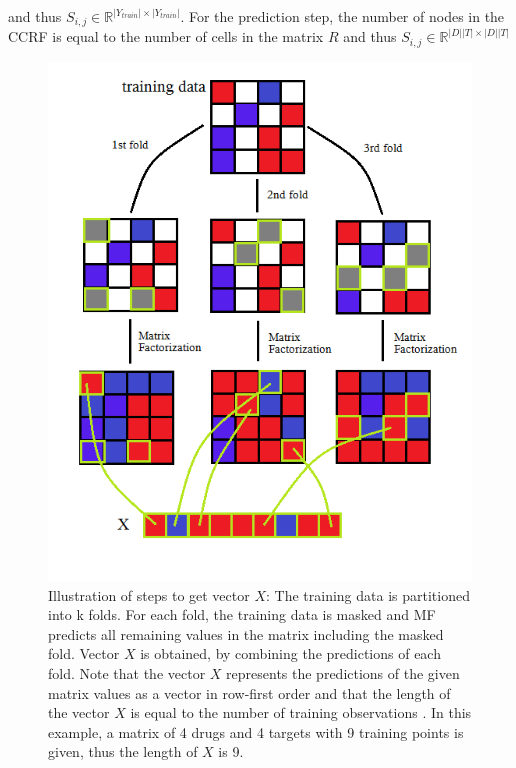  and thus $S_{i,j} \in \mathbb{R}^{|Y_{train}| \times |Y_{train}|}$. For the prediction step, the number of nodes in the CCRF is equal to the number of cells in the matrix $R$ and thus $S_{i,j} \in \mathbb{R}^{|D||T| \times |D||T|}$

\begin{figure}
\begin{center}
\includegraphics[scale=0.6]{ccrf_X.png}
\end{center}
\caption[Illustrations of steps to get vector $X$]{Illustration of steps to get vector $X$: The training data is partitioned into k folds. For each fold, the training data is masked and MF predicts all remaining values in the matrix including the masked fold. Vector $X$ is obtained, by combining the predictions of each fold. Note that the vector $X$ represents the predictions of the given matrix values as a vector in row-first order and that the length of the vector $X$ is equal to the number of training observations . In this example, a matrix of 4 drugs and 4 targets with 9 training points is given, thus the length of $X$ is 9.}
\label{fig:ccrf_X}
\end{figure}


